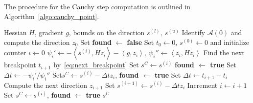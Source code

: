 \documentclass{article}
\numberwithin{equation}{section}
\newcommand{\calA}{{\mathcal{A}}}
\newcommand{\inner}[2]{\left\langle {#1} , {#2} \right\rangle} %
\theoremstyle{plain}
\begin{document}
				The procedure for the Cauchy step computation is outlined in Algorithm~\ref{algo:cauchy_point}.
				\begin{algorithm}
					\caption{Cauchy step computation}\label{algo:cauchy_point}
					\begin{algorithmic}[1]
						\Require Hessian $H$, gradient $g$, bounds on the direction $s^{(l)},\ s^{(u)}$
						\State Identify $\calA(0)$ and compute the direction $z_0$
						\State Set \textbf{found} $\gets$ \textbf{false} 
						\State Set $t_0\gets 0$, $s^{(0)}\gets 0$ and initialize counter $i\gets 0$
						\Repeat
						\State $\psi_i' \gets -\inner{s^{(i)}}{Hz_i}-\inner{g}{z_i},\ \psi_i'' \gets \inner{z_i}{Hz_i}$
						\State Find the next breakpoint $t_{i+1}$ by~\eqref{eq:next_breakpoint}
						\State Set $s^C \gets s^{(i)}$
						\State \textbf{found $\gets$ \textbf{true}}
						\State Set $\Delta t \gets - \psi_i'/\psi_i''$
						\State Set$s^C \gets s^{(i)} - \Delta t z_i$, \textbf{found $\gets$ \textbf{true}}
						\Else
						\State Set $\Delta t \gets t_{i+1}-t_i$
						\State Compute the next direction $z_{i+1}$
						\State Set $s^{(i+1)} \gets s^{(i)} - \Delta t z_i$
						\EndIf
						\State Increment $i \gets i+1$
						\If{$|\calA(t_i)| = n-m$}
						\State Set $s^C \gets s^{(i)}$, \textbf{found} $\gets$ \textbf{true}
						\EndIf
						\State \Return $s^C$
					\end{algorithmic}
				\end{algorithm}
				
				
				\clearpage
				
				
			
\end{document}
